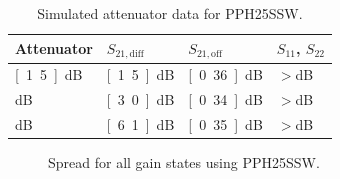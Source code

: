 		\begin{table}[h!]
			\caption{Simulated attenuator data for PPH25SSW.}
			\label{tab:VarGainData}
			\centering
			\begin{tabular}{ l l l l } \toprule
				Attenuator & 	$S_{21,\text{diff}}$ &	$S_{21,\text{off}}$ &  $S_{11}$, $S_{22}$ \\\midrule
				\unit[1.5]{dB} & \unit[1.5]{dB}	&	\unit[0.36]{dB} & $>$\unit[25]{dB} \\
				\unit[3]{dB} & \unit[3.0]{dB}	&	\unit[0.34]{dB} & $>$\unit[25]{dB} \\
				\unit[6]{dB} & \unit[6.1]{dB}	&	\unit[0.35]{dB} & $>$\unit[21]{dB} \\\bottomrule
			\end{tabular}
		\end{table}





		\begin{figure}[h!]
			\centering
			\caption[Spread for all gain-states]{Spread for all gain states using PPH25SSW.}\label{fig:All_attenuators_spread}
		\end{figure}


		
		


